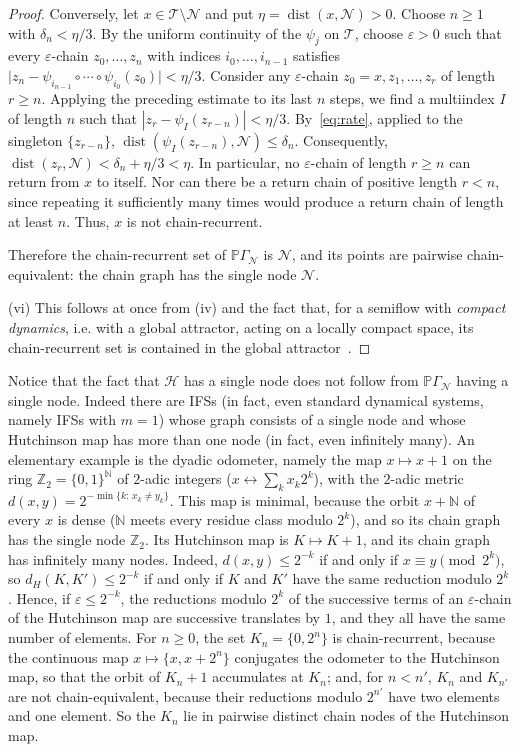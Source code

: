 \documentclass[11pt]{amsart}
\theoremstyle{definition}
\theoremstyle{remark}
\newcommand{\Z}{\mathbb Z}
\newcommand{\N}{\mathbb N}
\newcommand{\cN}{\mathcal N}
\newcommand{\PGN}{{\mathbb P}\Gamma_{\mathcal N}}
\begin{document}
\begin{proof}
Conversely, let $x\in\mathcal T\setminus \cN$ and put
$\eta=\operatorname{dist}(x,\cN)>0$.
Choose $n\geq 1$ with $\delta_n<\eta/3$.
By the uniform continuity of the $\psi_j$ on
$\mathcal T$, choose $\varepsilon>0$ such that every
$\varepsilon$-chain $z_0,\ldots,z_n$ with indices
$i_0,\ldots,i_{n-1}$ satisfies $\bigl|z_n-\psi_{i_{n-1}}\circ\cdots\circ\psi_{i_0}(z_0)\bigr|<\eta/3$.
Consider any $\varepsilon$-chain
$z_0=x,z_1,\ldots,z_r$ of length $r\geq n$.
Applying the preceding estimate to its last $n$ steps, we find a multiindex $I$ of length $n$ such that $|z_r-\psi_I(z_{r-n})|<\eta/3$.
By~\eqref{eq:rate}, applied to the singleton $\{z_{r-n}\}$, $\operatorname{dist}(\psi_I(z_{r-n}),\cN)\leq\delta_n$.
Consequently, $\operatorname{dist}(z_r,\cN)<\delta_n+\eta/3<\eta$.
In particular, no $\varepsilon$-chain of length $r\geq n$ can return from $x$ to itself.
Nor can there be a return chain of positive length $r<n$, since repeating it sufficiently many times would produce a return chain of length at least $n$.
Thus, $x$ is not chain-recurrent.

Therefore the chain-recurrent set of $\PGN$
is $\cN$, and its points are pairwise
chain-equivalent: the chain graph has the single
node $\cN$.

(vi) This follows at once from (iv) and the fact that, for a semiflow  with {\em compact dynamics}, i.e. with a global attractor, acting on a locally compact space, its chain-recurrent set is contained in the global attractor~\cite[Thm.~5.24]{DLY26DCDS}.
\end{proof}

Notice that the fact that $\mathcal H$ has a single node does not follow from $\PGN$ having a single node. 
Indeed there are IFSs (in fact, even standard dynamical systems, namely IFSs with $m=1$) whose graph consists of a single node and whose Hutchinson map has more than one node (in fact, even infinitely many).
An elementary example is the dyadic odometer, namely the map $x\mapsto x+1$ on the ring $\Z_2=\{0,1\}^\N$ of $2$-adic integers ($x\leftrightarrow\sum_kx_k2^k$),
with the $2$-adic metric $d(x,y)=2^{-\min\{k:\,x_k\neq y_k\}}$.
This map is minimal, because the orbit $x+\N$ of every $x$ is dense ($\N$ meets every residue class modulo $2^k$), and so its chain graph has the single node $\Z_2$. Its Hutchinson map is $K\mapsto K+1$, and its chain graph has infinitely many nodes. Indeed, $d(x,y)\le2^{-k}$ if and only if $x\equiv y\pmod{2^k}$, so $d_H(K,K')\le2^{-k}$ if and only if $K$ and $K'$ have the same reduction modulo $2^k$. Hence, if $\varepsilon\le2^{-k}$, the reductions modulo $2^k$ of the successive terms of an $\varepsilon$-chain of the Hutchinson map are successive translates by $1$, and they all have the same number of elements. For $n\ge0$, the set $K_n=\{0,2^n\}$ is chain-recurrent, because the continuous map $x\mapsto\{x,x+2^n\}$ conjugates the odometer to the Hutchinson map, so that the orbit of $K_n+1$ accumulates at $K_n$; and, for $n<n'$, $K_n$ and $K_{n'}$ are not chain-equivalent, because their reductions modulo $2^{n'}$ have two elements and one element. So the $K_n$ lie in pairwise distinct chain nodes of the Hutchinson map.
\end{document}
